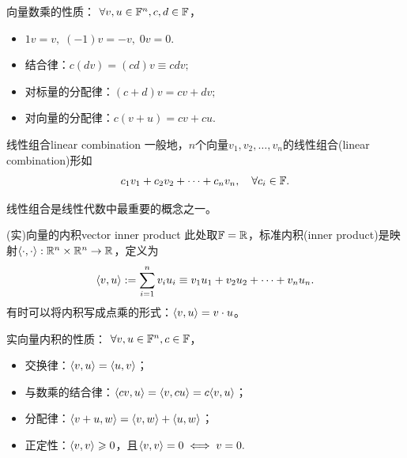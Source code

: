 \begin{corollary}
	向量数乘的性质：%
	$\forall v,u \in \mathbb{F}^n,c,d \in \mathbb{F}$，
    \begin{itemize}
        \item $1v = v,\;(-1)v = -v,\;0v = 0.$
        \item 结合律：$c(dv) = (cd)v \equiv cdv;$
        \item 对标量的分配律：$(c + d)v = cv + dv;$
        \item 对向量的分配律：$c(v + u) = cv + cu.$
    \end{itemize}
\end{corollary}

\begin{definition}{线性组合}{linear combination}
	一般地，$n$个向量$v_1,v_2,\ldots,v_n$的线性组合(linear combination)形如
	\begin{equation}\label{eq:la-linear-combination}
		c_1v_1 + c_2v_2 + \cdots + c_nv_n,\quad\forall c_i \in \mathbb{F}.
	\end{equation}
\end{definition}

\begin{remark}
	线性组合是线性代数中最重要的概念之一。
\end{remark}

\begin{definition}{(实)向量的内积}{vector inner product}
	此处取$\mathbb{F} = \mathbb{R}$，标准内积(inner product)是映射$\langle\cdot,\cdot\rangle :\mathbb{R}^n \times \mathbb{R}^n \to \mathbb{R}$，定义为
	\begin{equation}
		\langle v,u\rangle := \sum_{i=1}^nv_iu_i \equiv v_1u_1 + v_2u_2 + \cdots + v_nu_n.
	\end{equation}
	有时可以将内积写成点乘的形式：$\langle v,u\rangle = v \cdot u$。
\end{definition}

\begin{corollary}
	实向量内积的性质：%
	$\forall v,u \in \mathbb{F}^n,c \in \mathbb{F}$，
    \begin{itemize}
        \item 交换律：$\langle v,u\rangle = \langle u,v\rangle$；
        \item 与数乘的结合律：$\langle cv,u\rangle = \langle v,cu\rangle = c\langle v,u\rangle$；
        \item 分配律：$\langle v + u,w\rangle = \langle v,w\rangle + \langle u,w\rangle$；
        \item 正定性：$\langle v,v\rangle \geqslant 0$，且$\langle v,v\rangle = 0 \iff v = 0.$
    \end{itemize}
\end{corollary}

